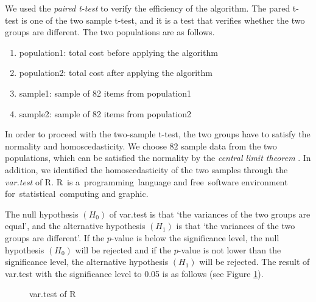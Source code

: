 \documentclass[a4paper]{amsart}
\numberwithin{equation}{section} %
\numberwithin{figure}{section} %
\numberwithin{table}{section}
\theoremstyle{plain}
\theoremstyle{definition}
\theoremstyle{plain}
\theoremstyle{plain}
\theoremstyle{plain}
\theoremstyle{plain}
\theoremstyle{plain}
\begin{document}
We used the {\it paired t-test}\cite{Rice} to verify the efficiency of the algorithm. The pared t-test is one of the two sample t-test, and it is a test that verifies whether the two groups are different. The two populations are as follows.

\begin{enumerate}[$\bullet$]
	\item population1: total cost before applying the algorithm
	\item population2: total cost after applying the algorithm
	\item sample1: sample of 82 items from population1
	\item sample2: sample of 82 items from population2
\end{enumerate}

In order to proceed with the two-sample t-test, the two groups have to satisfy the normality and homoscedasticity. We choose $82$ sample data from the two populations, which can be satisfied the normality by the {\it central limit theorem} \cite{Durrett}.
In addition, we identified the homoscedasticity of the two samples through the {\it var.test} of R. 
R is a programming language and free software environment for statistical computing and graphic. %



The null hypothesis $(H_{0})$ of var.test is that `the variances of the two groups are equal', and the alternative hypothesis $(H_{1})$ is that `the variances of the two groups are different'. 
If the $p$-value is below the significance level, the null hypothesis $(H_{0})$ will be rejected and if the $p$-value is not lower than the significance level, the alternative hypothesis $(H_{1})$ will be rejected.  The result of var.test with the significance level to 0.05 is as follows (see Figure \ref{fig:vartest}).

\begin{figure}[h!]
	\centering
	\caption{var.test of R}
	\label{fig:vartest}       %
\end{figure}
\end{document}

